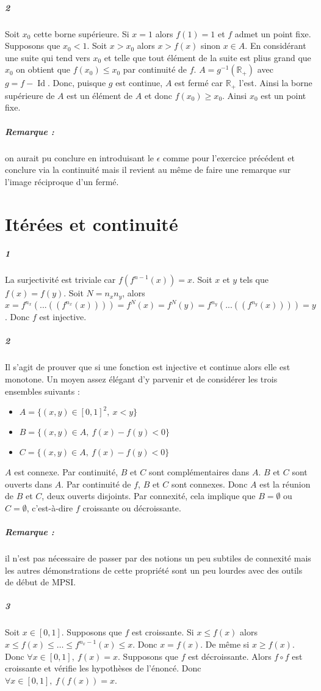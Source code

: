 \documentclass[10pt,a4paper]{article}
\begin{document}
\subparagraph{2}Soit $x_0$ cette borne supérieure. Si $x=1$ alors $f(1)=1$ et $f$ admet un point fixe. Supposons que $x_0 <1$. Soit $x>x_0$ alors $x>f(x)$ sinon $x \in A$. En considérant une suite qui tend vers $x_0$ et telle que tout élément de la suite est plius grand que $x_0$ on obtient que $f(x_0) \le x_0$ par continuité de $f$. $A = g^{-1}(\mathbb{R}_+)$ avec $g = f- \operatorname{Id}$. Donc, puisque $g$ est continue, $A$ est fermé car $\mathbb{R}_+$ l'est. Ainsi la borne supérieure de $A$ est un élément de $A$ et donc $f(x_0) \ge x_0$. Ainsi $x_0$ est un point fixe.

\subparagraph{Remarque :} on aurait pu conclure en introduisant le $\epsilon$ comme pour l'exercice précédent et conclure via la continuité mais il revient au même de faire une remarque sur l'image réciproque d'un fermé.

\section{Itérées et continuité}
\subparagraph{1}La surjectivité est triviale car $f(f^{n-1}(x)) = x$. Soit $x$ et $y$ tels que $f(x) = f(y)$. Soit $N = n_x n_y$, alors ${x = f^{n_x}\left( ... \left((f^{n_x}(x))\right) \right) = f^N(x) = f^N(y) = f^{n_y}\left( ... \left((f^{n_y}(x))\right) \right) = y} $. Donc $f$ est injective.
\subparagraph{2}Il s'agit de prouver que si une fonction est injective et continue alors elle est monotone. Un moyen assez élégant d'y parvenir et de considérer les trois ensembles suivants :
\begin{itemize}
\item $A = \lbrace (x,y) \in [0,1]^2, \ x<y\rbrace$
\item $B = \lbrace (x,y) \in A, \ f(x) - f(y) <0 \rbrace$
\item $C = \lbrace (x,y) \in A, \ f(x) - f(y) <0 \rbrace$
\end{itemize}
$A$ est connexe.
Par continuité, $B$ et $C$ sont complémentaires dans $A$. $B$ et $C$ sont ouverts dans $A$. Par continuité de $f$, $B$ et $C$ sont connexes. Donc $A$ est la réunion de $B$ et $C$, deux ouverts disjoints. Par connexité, cela implique que $B = \emptyset$ ou $C = \emptyset$, c'est-à-dire $f$ croissante ou décroissante.
\subparagraph{Remarque :} il n'est pas nécessaire de passer par des notions un peu subtiles de connexité mais les autres démonstrations de cette propriété sont un peu lourdes avec des outils de début de MPSI.
\subparagraph{3}Soit $x \in [0,1]$. Supposons que $f$ est croissante. Si $x \le f(x)$ alors ${x \le f(x) \le \dots \le f^{n_x-1}(x) \le x}$. Donc $x = f(x)$. De même si $x \ge f(x)$. Donc $\forall x \in [0,1], \ f(x) =x$. Supposons que $f$ est décroissante. Alors $f \circ f$ est croissante et vérifie les hypothèses de l'énoncé. Donc $\forall x \in [0,1], \ f(f(x)) = x$.
\end{document}
